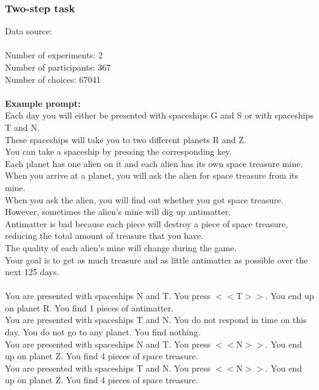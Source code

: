 \documentclass[pdflatex,sn-nature]{sn-jnl}%
\theoremstyle{thmstyleone}%
\theoremstyle{thmstyletwo}%
\theoremstyle{thmstylethree}%
\begin{document}
\subsubsection*{Two-step task}
Data source:  \cite{kool2017cost} \\ $~$ \\
Number of experiments: 2 $~$\\ 
Number of participants: 367 $~$\\ 
Number of choices: 67041 $~$\\ 
 $~$\\ 
\textbf{Example prompt:}
 $~$\\ 
Each day you will either be presented with spaceships G and S or with spaceships T and N. $~$\\ 
These spaceships will take you to two different planets R and Z. $~$\\ 
You can take a spaceship by pressing the corresponding key. $~$\\ 
Each planet has one alien on it and each alien has its own space treasure mine. $~$\\ 
When you arrive at a planet, you will ask the alien for space treasure from its mine. $~$\\ 
When you ask the alien, you will find out whether you got space treasure. $~$\\ 
However, sometimes the alien's mine will dig up antimatter. $~$\\ 
Antimatter is bad because each piece will destroy a piece of space treasure, reducing the total amount of treasure that you have. $~$\\ 
The quality of each alien's mine will change during the game. $~$\\ 
Your goal is to get as much treasure and as little antimatter as possible over the next 125 days. $~$\\ 
 $~$\\ 
You are presented with spaceships N and T. You press $<<$T$>>$. You end up on planet R. You find 1 pieces of antimatter. $~$\\ 
You are presented with spaceships T and N. You do not respond in time on this day. You do not go to any planet. You find nothing. $~$\\ 
You are presented with spaceships N and T. You press $<<$N$>>$. You end up on planet Z. You find 4 pieces of space treasure. $~$\\ 
You are presented with spaceships T and N. You press $<<$N$>>$. You end up on planet Z. You find 4 pieces of space treasure. $~$\\ 
\end{document}
